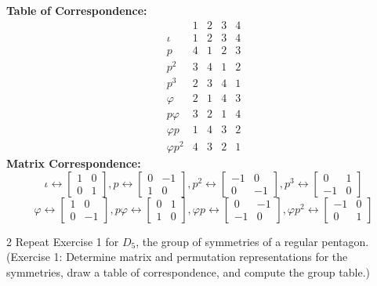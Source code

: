 \textbf{Table of Correspondence:}
\[
\begin{array}{c|cccc}
 & 1 & 2 & 3 & 4 \\ \hline
\iota        & 1 & 2 & 3 & 4 \\
p            & 4 & 1 & 2 & 3 \\
p^2          & 3 & 4 & 1 & 2 \\
p^3          & 2 & 3 & 4 & 1 \\
\varphi      & 2 & 1 & 4 & 3 \\
p\varphi     & 3 & 2 & 1 & 4 \\
\varphi p    & 1 & 4 & 3 & 2 \\
\varphi p^2  & 4 & 3 & 2 & 1
\end{array}
\]
\textbf{Matrix Correspondence:}
\[
\iota \longleftrightarrow 
\begin{bmatrix} 1 & 0 \\ 0 & 1 \end{bmatrix}, 
p \longleftrightarrow 
\begin{bmatrix} 0 & -1 \\ 1 & 0 \end{bmatrix}, 
p^2 \longleftrightarrow 
\begin{bmatrix} -1 & 0 \\ 0 & -1 \end{bmatrix}, 
p^3 \longleftrightarrow 
\begin{bmatrix} 0 & 1 \\ -1 & 0 \end{bmatrix}
\]
\[
\varphi \longleftrightarrow 
\begin{bmatrix} 1 & 0 \\ 0 & -1 \end{bmatrix}, 
p\varphi \longleftrightarrow 
\begin{bmatrix} 0 & 1 \\ 1 & 0 \end{bmatrix}, 
\varphi p \longleftrightarrow 
\begin{bmatrix} 0 & -1 \\ -1 & 0 \end{bmatrix}, 
\varphi p^2 \longleftrightarrow 
\begin{bmatrix} -1 & 0 \\ 0 & 1 \end{bmatrix}
\]

\begin{problem}{2}
    Repeat Exercise 1 for $D_5$, the group of symmetries of a regular pentagon.
    (Exercise 1: Determine matrix and permutation representations for the symmetries,
    draw a table of correspondence, and compute the group table.)
\end{problem}
\unsolved

